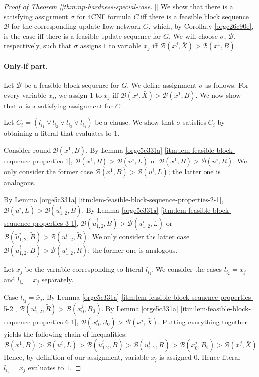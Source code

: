 \documentclass[fontsize=11pt,paper=a4]{book}
\begin{document}
\begin{proof}[Proof of Theorem [[thm:np-hardness-special-case]]]
We show that there is a satisfying assignment \(\sigma\) for 4CNF formula \(C\) iff there is a feasible block sequence \(\mathcal{B}\) for the corresponding update flow network \(G\), which, by Corollary \ref{orgc26c90e}, is the case iff there is a feasible update sequence for \(G\).
We will choose \(\sigma\), \(\mathcal{B}\), respectively, such that \(\sigma\) assigns \(1\) to variable \(x_j\) iff \(\mathcal{B}(x^j,\bar{X})>\mathcal{B}(x^1,B)\).

\paragraph{Only-if part.}
Let \(\mathcal{B}\) be a feasible block sequence for \(G\).
We define assignment \(\sigma\) as follows:
For every variable \(x_j\), we assign \(1\) to \(x_j\) iff \(\mathcal{B}(x^j,\bar{X})>\mathcal{B}(x^1,B)\).
We now show that \(\sigma\) is a satisfying assignment for \(C\).

Let \(C_i=(l_{i_1}\vee l_{i_2}\vee l_{i_3}\vee l_{i_4})\) be a clause.
We show that \(\sigma\) satisfies \(C_i\) by obtaining a literal that evaluates to \(1\).

Consider round \(\mathcal{B}(x^1,B)\).
By Lemma \ref{orge5c331a} \ref{itm:lem-feasible-block-sequence-properties-1}, \(\mathcal{B}(x^1,B)>\mathcal{B}(u^i,L)\) or \(\mathcal{B}(x^1,B)>\mathcal{B}(u^i,R)\).
We only consider the former case \(\mathcal{B}(x^1,B)>\mathcal{B}(u^i,L)\); the latter one is analogous.

By Lemma \ref{orge5c331a} \ref{itm:lem-feasible-block-sequence-properties-2-1}, \(\mathcal{B}(u^i,L)>\mathcal{B}(\tilde{u}_{1,2}^i,\tilde{B})\).
By Lemma \ref{orge5c331a} \ref{itm:lem-feasible-block-sequence-properties-3-1}, \(\mathcal{B}(\tilde{u}_{1,2}^i,\tilde{B})>\mathcal{B}(u_{1,2}^i,\tilde{L})\) or \(\mathcal{B}(\tilde{u}_{1,2}^i,\tilde{B})>\mathcal{B}(u_{1,2}^i,\tilde{R})\).
We only consider the latter case \(\mathcal{B}(\tilde{u}_{1,2}^i,\tilde{B})>\mathcal{B}(u_{1,2}^i,\tilde{R})\); the former one is analogous.

Let \(x_j\) be the variable corresponding to literal \(l_{i_2}\).
We consider the cases \(l_{i_2}=\bar{x}_j\) and \(l_{i_2}=x_j\) separately.

Case \(l_{i_2}=\bar{x}_j\).
By Lemma \ref{orge5c331a} \ref{itm:lem-feasible-block-sequence-properties-5-2}, \(\mathcal{B}(u_{1,2}^i,\tilde{R})>\mathcal{B}(x_0^j,B_0)\).
By Lemma \ref{orge5c331a} \ref{itm:lem-feasible-block-sequence-properties-6-1}, \(\mathcal{B}(x_0^j,B_0)>\mathcal{B}(x^j,\bar{X})\).
Putting everything together yields the following chain of inequalities:
\[
\mathcal{B}(x^1,B)>
\mathcal{B}(u^i,L)>
\mathcal{B}(\tilde{u}_{1,2}^i,\tilde{B})>
\mathcal{B}(u_{1,2}^i,\tilde{R})>
\mathcal{B}(x_0^j,B_0)>
\mathcal{B}(x^j,\bar{X})
\]
Hence, by definition of our assignment, variable \(x_j\) is assigned \(0\).
Hence literal \(l_{i_2}=\bar{x}_j\) evaluates to \(1\).


\end{proof}
\end{document}

